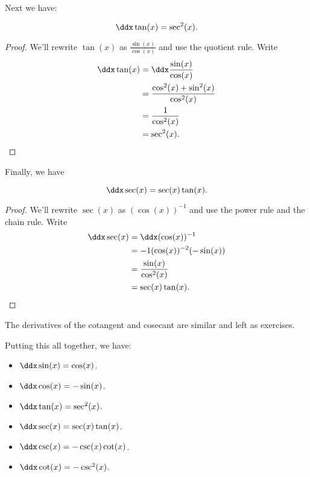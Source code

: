 Next we have:

\begin{theorem}
\[
\ddx \tan(x) = \sec^2(x).
\]
\end{theorem}

\begin{proof}
We'll rewrite $\tan(x)$ as $\frac{\sin(x)}{\cos(x)}$ and use the quotient rule. Write
\begin{align*}
\ddx\tan(x) &= \ddx\frac{\sin(x)}{\cos(x)}\\
&=\frac{\cos^2(x) + \sin^2(x)}{\cos^2(x)}\\
&=\frac{1}{\cos^2(x)}\\
&=\sec^2(x).
\end{align*}
\end{proof}

Finally, we have

\begin{theorem}
\[
\ddx \sec(x) = \sec(x)\tan(x).
\]
\end{theorem}

\begin{proof}
We'll rewrite $\sec(x)$ as $(\cos(x))^{-1}$ and use the power rule and the chain rule. Write
\begin{align*}
\ddx \sec(x) &= \ddx(\cos (x))^{-1}\\
&=-1(\cos(x))^{-2}(-\sin(x)) \\
&= \frac{\sin(x)}{\cos^2(x)} \\
&= \sec(x)\tan(x).
\end{align*}
\end{proof}


The derivatives of the cotangent and cosecant are similar and left as
exercises. 

Putting this all together, we have:

\begin{mainTheorem} \hfil
\begin{itemize}
\item $\ddx \sin(x) = \cos(x)$.
\item $\ddx \cos(x) = -\sin(x)$.
\item $\ddx \tan(x) = \sec^2(x)$.
\item $\ddx \sec(x) = \sec(x)\tan(x)$.
\item $\ddx \csc(x) = -\csc(x)\cot(x)$.
\item $\ddx \cot(x) = -\csc^2(x)$.
\end{itemize}
\end{mainTheorem}


